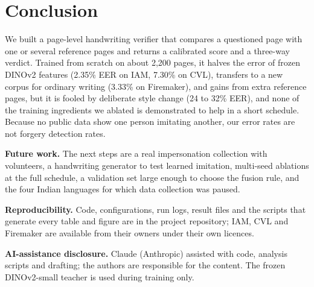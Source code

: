 \section{Conclusion}
We built a page-level handwriting verifier that compares a questioned page with one or several reference pages and returns a calibrated score and a three-way verdict.
Trained from scratch on about 2,200 pages, it halves the error of frozen DINOv2 features (2.35\% EER on IAM, 7.30\% on CVL), transfers to a new corpus for ordinary writing (3.33\% on Firemaker), and gains from extra reference pages, but it is fooled by deliberate style change (24 to 32\% EER), and none of the training ingredients we ablated is demonstrated to help in a short schedule.
Because no public data show one person imitating another, our error rates are not forgery detection rates.

\textbf{Future work.}
The next steps are a real impersonation collection with volunteers, a handwriting generator to test learned imitation, multi-seed ablations at the full schedule, a validation set large enough to choose the fusion rule, and the four Indian languages for which data collection was paused.

\textbf{Reproducibility.}
Code, configurations, run logs, result files and the scripts that generate every table and figure are in the project repository; IAM, CVL and Firemaker are available from their owners under their own licences.

\textbf{AI-assistance disclosure.}
Claude (Anthropic) assisted with code, analysis scripts and drafting; the authors are responsible for the content.
The frozen DINOv2-small teacher is used during training only.

